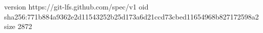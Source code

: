 version https://git-lfs.github.com/spec/v1
oid sha256:771b884a9362e2d11543252b25d173a6d21ccd73cbed11654968b827172598a2
size 2872

